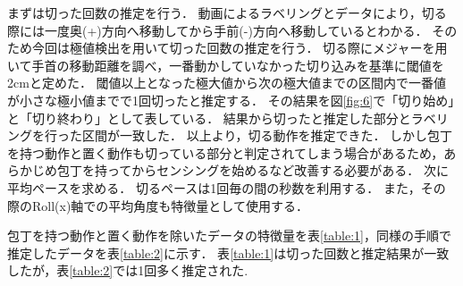 まずは切った回数の推定を行う．
動画によるラベリングとデータにより，切る際には一度奥(+)方向へ移動してから手前(-)方向へ移動しているとわかる．
そのため今回は極値検出を用いて切った回数の推定を行う．
切る際にメジャーを用いて手首の移動距離を調べ，一番動かしていなかった切り込みを基準に閾値を2cmと定めた．
閾値以上となった極大値から次の極大値までの区間内で一番値が小さな極小値までで1回切ったと推定する．
その結果を図\ref{fig:6}で「切り始め」と「切り終わり」として表している．
結果から切ったと推定した部分とラベリングを行った区間が一致した．
以上より，切る動作を推定できた．
しかし包丁を持つ動作と置く動作も切っている部分と判定されてしまう場合があるため，あらかじめ包丁を持ってからセンシングを始めるなど改善する必要がある．
次に平均ペースを求める．
切るペースは1回毎の間の秒数を利用する．
また，その際のRoll(x)軸での平均角度も特徴量として使用する．

包丁を持つ動作と置く動作を除いたデータの特徴量を表\ref{table:1}，同様の手順で推定したデータを表\ref{table:2}に示す．
表\ref{table:1}は切った回数と推定結果が一致したが，表\ref{table:2}では1回多く推定された.
\begin{table}[ht]
    \centering
    \caption{平造りの特徴量}
    \label{table:1}
\end{table}

